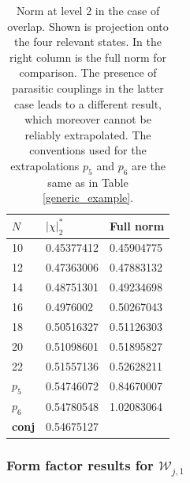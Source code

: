 \documentclass[a4paper,10pt]{article}
\newcommand{\aSt}{\mathcal{W}}
\newcommand{\AStTL}[2]{\aSt_{#1,#2}}
\begin{document}
\begin{table}[H]
\center
\begin{tabular}{lll}
$N$ & $| \chi |_2^{*}$ & Full norm \\
\hline
10 & 0.45377412 &  0.45904775   \\
12 & 0.47363006 &  0.47883132   \\
14 & 0.48751301 &  0.49234698   \\
16 & 0.4976002 &  0.50267043   \\
18 & 0.50516327 &  0.51126303   \\
20 & 0.51098601 &  0.51895827   \\
22 & 0.51557136 &  0.52628211   \\
$p_5$ & 0.54746072  & 0.84670007 \\
$p_6$ & 0.54780548  & 1.02083064 \\
\bf{conj} & 0.54675127 \\
%
\hline
\end{tabular}
\caption{Norm at level 2 in the case of overlap. Shown is projection onto the four relevant states. In the right column is the full norm for comparison. The presence of parasitic couplings in the latter case leads to a different result, which moreover cannot be reliably extrapolated. The conventions used for the extrapolations $p_5$ and $p_6$ are the same as in Table \ref{generic_example}.}\label{level2_all4}
\end{table}




\subsubsection{Form factor results for $\AStTL{j}{1}$}\label{FF_results_Wj1}
\end{document}

